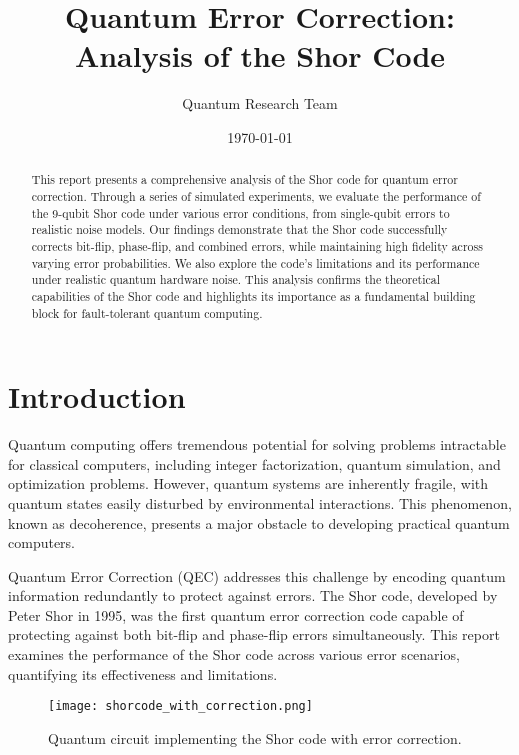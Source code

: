 \documentclass[12pt,a4paper]{article}
\title{Quantum Error Correction: Analysis of the Shor Code}
\author{Quantum Research Team}
\date{\today}
\begin{document}
\maketitle

\begin{abstract}
    This report presents a comprehensive analysis of the Shor code for quantum error correction. Through a series of simulated experiments, we evaluate the performance of the 9-qubit Shor code under various error conditions, from single-qubit errors to realistic noise models. Our findings demonstrate that the Shor code successfully corrects bit-flip, phase-flip, and combined errors, while maintaining high fidelity across varying error probabilities. We also explore the code's limitations and its performance under realistic quantum hardware noise. This analysis confirms the theoretical capabilities of the Shor code and highlights its importance as a fundamental building block for fault-tolerant quantum computing.
\end{abstract}

\tableofcontents
\newpage

\section{Introduction}

Quantum computing offers tremendous potential for solving problems intractable for classical computers, including integer factorization, quantum simulation, and optimization problems. However, quantum systems are inherently fragile, with quantum states easily disturbed by environmental interactions. This phenomenon, known as decoherence, presents a major obstacle to developing practical quantum computers.

Quantum Error Correction (QEC) addresses this challenge by encoding quantum information redundantly to protect against errors. The Shor code, developed by Peter Shor in 1995, was the first quantum error correction code capable of protecting against both bit-flip and phase-flip errors simultaneously. This report examines the performance of the Shor code across various error scenarios, quantifying its effectiveness and limitations.

\begin{figure}[H]
    \centering
    \texttt{[image: shorcode\_with\_correction.png]}
    \caption{Quantum circuit implementing the Shor code with error correction.}
    \label{fig:shor_circuit}
\end{figure}
\end{document}
